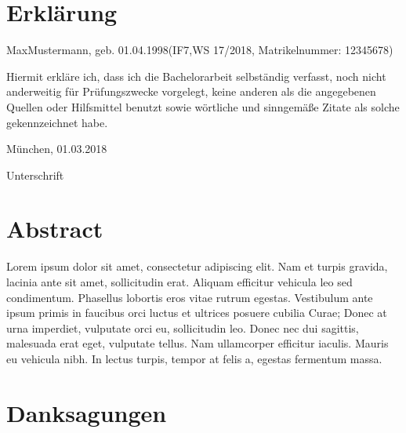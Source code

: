 \documentclass[listof=totoc,index=totoc,bibliography=totoc,12pt,ngerman,a4paper,]{report}
\begin{document}
\chapter*{Erklärung}\label{erkluxe4rung}

\begin{center}
  Max\space Mustermann, geb. 01.04.1998\space(IF7,\space WS 17/2018, Matrikelnummer: 12345678)
\end{center}

\vspace*{1.0cm}

\noindent Hiermit erkläre ich, dass ich die Bachelorarbeit selbständig
verfasst, noch nicht anderweitig für Prüfungszwecke vorgelegt, keine
anderen als die angegebenen Quellen oder Hilfsmittel benutzt sowie
wörtliche und sinngemäße Zitate als solche gekennzeichnet habe.

\vspace*{1.0cm}

München, 01.03.2018

\vspace*{1.0cm}

\dotfill

Unterschrift \vspace*{\fill}  \newpage

\chapter*{Abstract}\label{abstract}

Lorem ipsum dolor sit amet, consectetur adipiscing elit. Nam et turpis
gravida, lacinia ante sit amet, sollicitudin erat. Aliquam efficitur
vehicula leo sed condimentum. Phasellus lobortis eros vitae rutrum
egestas. Vestibulum ante ipsum primis in faucibus orci luctus et
ultrices posuere cubilia Curae; Donec at urna imperdiet, vulputate orci
eu, sollicitudin leo. Donec nec dui sagittis, malesuada erat eget,
vulputate tellus. Nam ullamcorper efficitur iaculis. Mauris eu vehicula
nibh. In lectus turpis, tempor at felis a, egestas fermentum massa.

\setcounter{page}{1}

\newpage

\chapter*{Danksagungen}\label{danksagungen}
\end{document}
